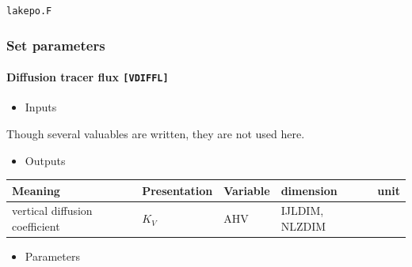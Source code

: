 \texttt{lakepo.F}

\hypertarget{set-parameters}{%
\subsubsection{Set parameters}\label{set-parameters}}

\hypertarget{diffusion-tracer-flux-vdiffl}{%
\paragraph{\texorpdfstring{Diffusion tracer flux
\texttt{{[}VDIFFL{]}}}{Diffusion tracer flux {[}VDIFFL{]}}}\label{diffusion-tracer-flux-vdiffl}}

\begin{itemize}
\tightlist
\item
  Inputs
\end{itemize}

Though several valuables are written, they are not used here.

\begin{itemize}
\tightlist
\item
  Outputs
\end{itemize}

\setlength\LTleft{0pt}\setlength\LTright{0pt}\begin{longtable}[]{@{}lllll@{}}
\toprule\relax
Meaning & Presentation & Variable & dimension & unit\tabularnewline
\midrule\relax
\endhead
vertical diffusion coefficient & \(K_V\) & AHV & IJLDIM, NLZDIM
&\tabularnewline
\bottomrule
\end{longtable}

\begin{itemize}
\tightlist
\item
  Parameters
\end{itemize}

